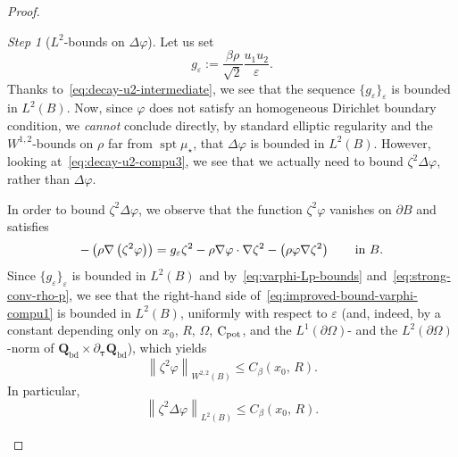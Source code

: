 \documentclass[a4paper, 11pt, twoside, leqno]{article}
\theoremstyle{definition}              %
\theoremstyle{remark}                  %
\newtheorem{step}{Step}
\DeclareMathOperator{\spt}{spt}                                     %
\let\div\relax
\DeclareMathOperator{\div}{div}                                     %
\newcommand{\norm}[1]{\left\| #1 \right\|}                          %
\newcommand{\csubset}{\subset\!\subset}                             %
\newcommand{\Q}{\mathbf{Q}}
\newcommand{\eps}{\varepsilon}
\newcommand{\Cpot}{{\rm C}_{\rm pot}}
\newcommand{\ttau}{{\boldsymbol{\tau}}}
\newcommand{\Qb}{\Q_{\mathrm{bd}}}
\begin{document}
\begin{proof}
\begin{step}[$L^2$-bounds on $\Delta \varphi$]
    Let us set 
    \[
        g_\eps := \frac{\beta \rho }{\sqrt{2}}\frac{u_1 u_2}{\eps}.
    \]
    Thanks to~\eqref{eq:decay-u2-intermediate}, we see that the sequence $\{g_\eps\}_\eps$ is bounded in $L^2(B)$. Now, since $\varphi$ does not satisfy an homogeneous Dirichlet boundary condition, we \emph{cannot} conclude directly, by standard elliptic regularity and the $W^{1,2}$-bounds on $\rho$ far from $\spt \mu_\star$, that $\Delta \varphi$ is bounded in $L^2(B)$. However, looking at~\eqref{eq:decay-u2-compu3}, we see that we actually need to bound $\zeta^2 \Delta \varphi$, rather than $\Delta \varphi$. 

    In order to bound $\zeta^2 \Delta \varphi$, we observe that the function $\zeta^2 \varphi$ vanishes on $\partial B$ and satisfies 
    \begin{equation}\label{eq:improved-bound-varphi-compu1}
      -\div\left( \rho \nabla\left(\zeta^2 \varphi\right) \right) = g_\eps \zeta^2 - \rho \nabla \varphi \cdot \nabla \zeta^2 - \div\left(\rho \varphi \nabla \zeta^2\right) 
      \qquad \mbox{in } B.  
    \end{equation}
    Since $\{g_\eps\}_\eps$ is bounded in $L^2(B)$ and by~\eqref{eq:varphi-Lp-bounds} 
    and~\eqref{eq:strong-conv-rho-p}, we see that the right-hand side 
    of~\eqref{eq:improved-bound-varphi-compu1} is bounded in $L^2(B)$, uniformly with respect to $\eps$ 
    (and, indeed, by a constant depending only on $x_0$, $R$, $\Omega$, $\Cpot$, and the $L^1(\partial\Omega)$- and the $L^2(\partial \Omega)$-norm of $\Qb \times \partial_\ttau \Qb$), which yields 
    \[
        \norm{\zeta^2 \varphi}_{W^{2,2}(B)} \leq C_\beta(x_0,\,R).
    \]
    In particular,
    \begin{equation}\label{eq:Delta-varphi}
        \norm{\zeta^2 \Delta \varphi}_{L^2(B)} \leq C_\beta(x_0,\,R). 
    \end{equation}
\end{step}


\end{proof}
\end{document}
